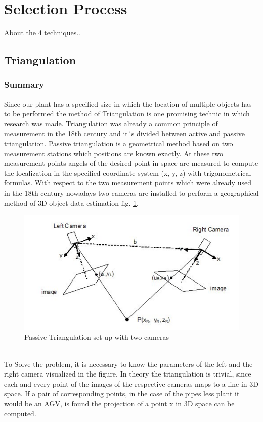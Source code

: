 \section{Selection Process} 

About the 4 techniques..

\subsection{Triangulation} %
\subsubsection*{Summary}
Since our plant has a specified size in which the location of multiple objects has to be performed the method of Triangulation is one promising technic in which research was made. 
Triangulation was already a common principle of measurement in the 18th century and it´s divided between active and passive triangulation. Passive triangulation is a geometrical method based on two measurement stations which positions are known exactly. At these two measurement points angels of the desired point in space are measured to compute the localization in the specified coordinate system (x, y, z) with trigonometrical formulas.
With respect to the two measurement points which were already used in the 18th century nowadays two cameras are installed to perform a geographical method of 3D object-data estimation fig. \ref{Triangulation}.
\begin{figure}[!htbp]
\centering
\includegraphics[width = 16cm]{Pictures/Triangulation}
\caption{Passive Triangulation set-up with two cameras}
\label{Triangulation}
\end{figure}\\
To Solve the problem, it is necessary to know the parameters of the left and the right camera visualized in the figure. In theory the triangulation is trivial, since each and every point of the images of the respective cameras maps to a line in 3D space. If a pair of corresponding points, in the case of the pipes less plant it would be an AGV, is found the projection of a point x in 3D space can be computed. 
